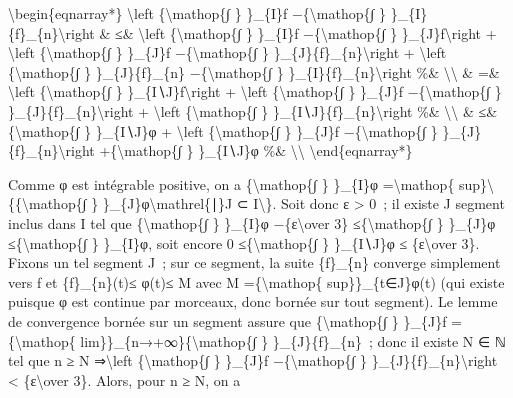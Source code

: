 \documentclass[]{article}
\begin{document}
\textbackslash{}begin\{eqnarray*\} \textbackslash{}left
\textbar{}\{\textbackslash{}mathop\{∫ \} \}\_\{I\}f
−\{\textbackslash{}mathop\{∫ \}
\}\_\{I\}\{f\}\_\{n\}\textbackslash{}right \textbar{}\& ≤\&
\textbackslash{}left \textbar{}\{\textbackslash{}mathop\{∫ \} \}\_\{I\}f
−\{\textbackslash{}mathop\{∫ \} \}\_\{J\}f\textbackslash{}right
\textbar{} + \textbackslash{}left \textbar{}\{\textbackslash{}mathop\{∫
\} \}\_\{J\}f −\{\textbackslash{}mathop\{∫ \}
\}\_\{J\}\{f\}\_\{n\}\textbackslash{}right \textbar{} +
\textbackslash{}left \textbar{}\{\textbackslash{}mathop\{∫ \}
\}\_\{J\}\{f\}\_\{n\} −\{\textbackslash{}mathop\{∫ \}
\}\_\{I\}\{f\}\_\{n\}\textbackslash{}right \textbar{}\%\&
\textbackslash{}\textbackslash{} \& =\& \textbackslash{}left
\textbar{}\{\textbackslash{}mathop\{∫ \}
\}\_\{I∖J\}f\textbackslash{}right \textbar{} + \textbackslash{}left
\textbar{}\{\textbackslash{}mathop\{∫ \} \}\_\{J\}f
−\{\textbackslash{}mathop\{∫ \}
\}\_\{J\}\{f\}\_\{n\}\textbackslash{}right \textbar{} +
\textbackslash{}left \textbar{}\{\textbackslash{}mathop\{∫ \}
\}\_\{I∖J\}\{f\}\_\{n\}\textbackslash{}right \textbar{} \%\&
\textbackslash{}\textbackslash{} \& ≤\& \{\textbackslash{}mathop\{∫ \}
\}\_\{I∖J\}φ + \textbackslash{}left
\textbar{}\{\textbackslash{}mathop\{∫ \} \}\_\{J\}f
−\{\textbackslash{}mathop\{∫ \}
\}\_\{J\}\{f\}\_\{n\}\textbackslash{}right \textbar{}
+\{\textbackslash{}mathop\{∫ \} \}\_\{I∖J\}φ \%\&
\textbackslash{}\textbackslash{} \textbackslash{}end\{eqnarray*\}

Comme φ est intégrable positive, on a \{\textbackslash{}mathop\{∫ \}
\}\_\{I\}φ =\textbackslash{}mathop\{
sup\}\textbackslash{}\{\{\textbackslash{}mathop\{∫ \}
\}\_\{J\}φ\textbackslash{}mathrel\{∣\}J ⊂ I\textbackslash{}\}. Soit donc
ε \textgreater{} 0~; il existe J segment inclus dans I tel que
\{\textbackslash{}mathop\{∫ \} \}\_\{I\}φ −\{ε\textbackslash{}over 3\}
≤\{\textbackslash{}mathop\{∫ \} \}\_\{J\}φ ≤\{\textbackslash{}mathop\{∫
\} \}\_\{I\}φ, soit encore 0 ≤\{\textbackslash{}mathop\{∫ \}
\}\_\{I∖J\}φ ≤ \{ε\textbackslash{}over 3\}. Fixons un tel segment J~;
sur ce segment, la suite \{f\}\_\{n\} converge simplement vers f et
\textbar{}\{f\}\_\{n\}(t)\textbar{}≤ φ(t)\textbar{}≤ M avec M
=\{\textbackslash{}mathop\{ sup\}\}\_\{t∈J\}φ(t) (qui existe puisque φ
est continue par morceaux, donc bornée sur tout segment). Le lemme de
convergence bornée sur un segment assure que \{\textbackslash{}mathop\{∫
\} \}\_\{J\}f =\{\textbackslash{}mathop\{
lim\}\}\_\{n→+∞\}\{\textbackslash{}mathop\{∫ \} \}\_\{J\}\{f\}\_\{n\}~;
donc il existe N ∈ ℕ tel que n ≥ N ⇒\textbackslash{}left
\textbar{}\{\textbackslash{}mathop\{∫ \} \}\_\{J\}f
−\{\textbackslash{}mathop\{∫ \}
\}\_\{J\}\{f\}\_\{n\}\textbackslash{}right \textbar{} \textless{}
\{ε\textbackslash{}over 3\}. Alors, pour n ≥ N, on a
\end{document}
